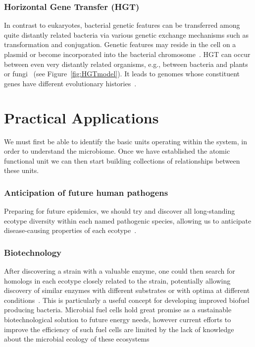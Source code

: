 \subsubsection*{Horizontal Gene Transfer (HGT)}
In contrast to eukaryotes, bacterial genetic features can be transferred among quite distantly related bacteria via various genetic exchange mechanisms such as transformation and conjugation.
Genetic features may reside in the cell on a plasmid or become incorporated into the bacterial chromosome~\cite{staley1997biodiversity}.
HGT can occur between even very distantly related organisms, e.g., between bacteria and plants or fungi~\cite{gogarten2002prokaryotic} (see Figure~\ref{fig:HGTmodel}).
It leads to genomes whose constituent genes have different evolutionary histories~\cite{gogarten2002prokaryotic}.

\section{Practical Applications}
We must first be able to identify the basic units operating within the system, in order to understand the microbiome.
Once we have established the atomic functional unit we can then start building collections of relationships between these units. 

\subsubsection*{Anticipation of future human pathogens}
Preparing for future epidemics, we should try and discover all long-standing ecotype diversity within each named pathogenic species, allowing us to anticipate disease-causing properties of each ecotype~\cite{cohan2007systematics}.

\subsubsection*{Biotechnology}
After discovering a strain with a valuable enzyme, one could then search for homologs in each ecotype closely related to the strain, potentially allowing discovery of similar enzymes with different substrates or with optima at different conditions~\cite{cohan2007systematics}.
This is particularly a useful concept for developing improved biofuel producing bacteria.
Microbial fuel cells hold great promise as a sustainable biotechnological solution to future energy needs, however current efforts to improve the efficiency of such fuel cells are limited by the lack of knowledge about the microbial ecology of these ecosystems~\cite{rabaey2004biofuel}

